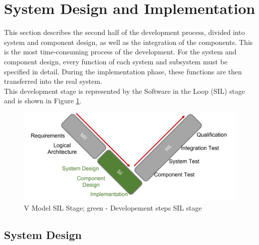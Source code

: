 \section{System Design and Implementation}
This section describes the second half of the development process, divided into system and component design, as well as the integration of the components. This is the most time-consuming process of the development. For the system and component design, every function of each system and subsystem must be specified in detail. During the implementation phase, these functions are then transferred into the real system.\\
This development stage is represented by the Software in the Loop (SIL) stage and is shown in Figure \ref{V Model System Design}.
 
\begin{figure}
    \begin{center}
    \includegraphics[width=12cm]{Pictures/V Model System Design.png}
    \caption[V Model System Design]{V Model SIL Stage; green - Developement steps SIL stage}
    \label{V Model System Design}
    \end{center}
\end{figure}
 
\subsection{System Design}
 
